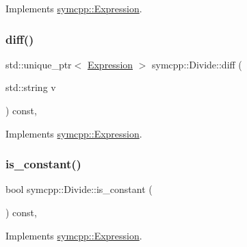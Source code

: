 Implements \mbox{\hyperlink{classsymcpp_1_1Expression_a2e7de5a295ccf0efdc9b34cea7ba3d0b}{symcpp\+::\+Expression}}.

\mbox{\label{classsymcpp_1_1Divide_aeecc60e1759b81ea65b0b95a62ff38df}} 
\subsubsection{\texorpdfstring{diff()}{diff()}}
{\footnotesize\ttfamily std\+::unique\+\_\+ptr$<$ \mbox{\hyperlink{classsymcpp_1_1Expression}{Expression}} $>$ symcpp\+::\+Divide\+::diff (\begin{DoxyParamCaption}\item[{std\+::string}]{v }\end{DoxyParamCaption}) const\hspace{0.3cm}{\ttfamily [override]}, {\ttfamily [virtual]}}



Implements \mbox{\hyperlink{classsymcpp_1_1Expression_a032fe8da79d5e231ca2d21a201c8f32d}{symcpp\+::\+Expression}}.

\mbox{\label{classsymcpp_1_1Divide_a342ddc6fb6f80a37797bda030b4c7580}} 
\subsubsection{\texorpdfstring{is\_constant()}{is\_constant()}}
{\footnotesize\ttfamily bool symcpp\+::\+Divide\+::is\+\_\+constant (\begin{DoxyParamCaption}{ }\end{DoxyParamCaption}) const\hspace{0.3cm}{\ttfamily [override]}, {\ttfamily [virtual]}}



Implements \mbox{\hyperlink{classsymcpp_1_1Expression_a30db7917c8948e22330cbe8259caeae2}{symcpp\+::\+Expression}}.

\mbox{\label{classsymcpp_1_1Divide_a016fec0e409cff8d0cd2b53eea1fa6c3}} 
